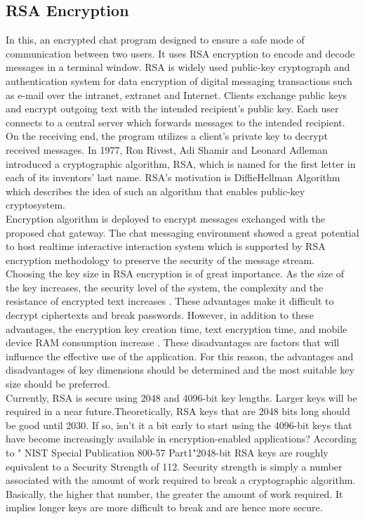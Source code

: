 \subsection{RSA Encryption}
In this, an encrypted chat program designed to
ensure a safe mode of communication between two users. It
uses RSA encryption to encode and decode messages in a
terminal window. RSA is widely used public-key
cryptograph and authentication system for data encryption of
digital messaging transactions such as e-mail over the
intranet, extranet and Internet. Clients exchange public keys
and encrypt outgoing text with the intended recipient’s public
key. Each user connects to a central server which
forwards messages to the intended recipient. On the receiving
end, the program utilizes a client’s private key to decrypt
received messages. In 1977, Ron Rivest, Adi Shamir and
Leonard Adleman introduced a cryptographic algorithm,
RSA, which is named for the first letter in each of its
inventors’ last name. RSA’s motivation is DiffieHellman Algorithm which describes the idea of such an
algorithm that enables public-key cryptosystem.\\
Encryption algorithm is deployed to encrypt messages
exchanged with the proposed chat gateway. The chat messaging
environment showed a great potential to host realtime
interactive interaction system which is supported by RSA
encryption methodology to preserve the security of the
message stream. \\
Choosing the key size in RSA encryption is of great
importance. As the size of the key increases, the security level
of the system, the complexity and the resistance of encrypted
text increases . These advantages make it difficult to
decrypt ciphertexts and break passwords. However, in
addition to these advantages, the encryption key creation
time, text encryption time, and mobile device RAM
consumption increase . These disadvantages are
factors that will influence the effective use of the application.
For this reason, the advantages and disadvantages of key
dimensions should be determined and the most suitable key
size should be preferred. \cite{sonmez2017development}\\
Currently, RSA is secure using 2048 and 4096-bit key lengths.
Larger keys will be required in a near future.Theoretically, RSA keys that are 2048 bits long should be good until 2030. If so, isn't it a bit early to start using the 4096-bit keys that have become increasingly available in encryption-enabled applications?
According to " NIST Special Publication 800-57 Part1"2048-bit RSA keys are roughly equivalent to a Security Strength of 112. Security strength is simply a number associated with the amount of work required to break a cryptographic algorithm. Basically, the higher that number, the greater the amount of work required.
It implies longer keys are more difficult to break and are hence more secure.\\

